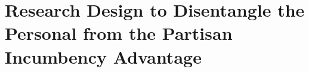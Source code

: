 


  
\section{Research Design to Disentangle the Personal from the Partisan Incumbency Advantage \label{sec:design}}

